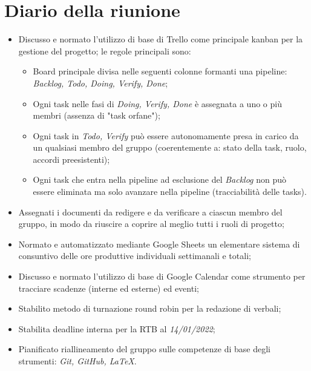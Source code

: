 \section{Diario della riunione}
\begin{itemize}
  \item Discusso e normato l'utilizzo di base di Trello come principale kanban per la gestione del progetto; le regole principali sono:
  \begin{itemize}
    \item Board principale divisa nelle seguenti colonne formanti una pipeline: \textit{Backlog, Todo, Doing, Verify, Done};
    \item Ogni task nelle fasi di \textit{Doing, Verify, Done} è assegnata a uno o più membri (assenza di "task orfane");
    \item Ogni task in \textit{Todo, Verify} può essere autonomamente presa in carico da un qualsiasi membro del gruppo (coerentemente a: stato della task, ruolo, accordi preesistenti);
    \item Ogni task che entra nella pipeline ad esclusione del \textit{Backlog} non può essere eliminata ma solo avanzare nella pipeline (tracciabilità delle tasks).
  \end{itemize}
  \item Assegnati i documenti da redigere e da verificare a ciascun membro del gruppo, in modo da riuscire a coprire al meglio tutti i ruoli di progetto;
  \item Normato e automatizzato mediante Google Sheets un elementare sistema di consuntivo delle ore produttive individuali settimanali e totali;
  \item Discusso e normato l'utilizzo di base di Google Calendar come strumento per tracciare scadenze (interne ed esterne) ed eventi;
  \item Stabilito metodo di turnazione round robin per la redazione di verbali;
  \item Stabilita deadline interna per la RTB al \textit{14/01/2022};
  \item Pianificato riallineamento del gruppo sulle competenze di base degli strumenti: \textit{Git, GitHub, LaTeX}.
\end{itemize}